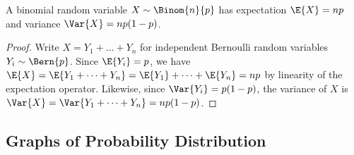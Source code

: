 \begin{proposition}
    A binomial random variable $X \sim \Binom{n}{p}$ has expectation $\E{X} = np$ and variance $\Var{X} = np(1-p)$.
\end{proposition}
\begin{proof}%
    Write $X = Y_1 + \dots + Y_n$ for independent Bernoulli random variables $Y_i \sim \Bern{p}$. Since $\E{Y_i} = p$, we have $\E{X} = \E{Y_1 + \dots + Y_n} = \E{Y_1} + \dots + \E{Y_n} = np$ by linearity of the expectation operator. Likewise, since $\Var{Y_i} = p(1-p)$, the variance of $X$ is $\Var{X} = \Var{Y_1 + \dots + Y_n} = np(1-p)$.
\end{proof}

\subsection{Graphs of Probability Distribution}

